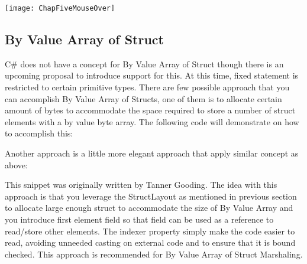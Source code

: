 \texttt{[image: ChapFiveMouseOver]}
\newpage

\subsection{By Value Array of Struct}
C\# does not have a concept for By Value Array of Struct though there is an upcoming proposal to introduce support for this. At this time, fixed statement is restricted to certain primitive types. There are few possible approach that you can accomplish By Value Array of Structs, one of them is to allocate certain amount of bytes to accommodate the space required to store a number of struct elements with a by value byte array. The following code will demonstrate on how to accomplish this:


\newpage
Another approach is a little more elegant approach that apply similar concept as above:



This snippet was originally written by Tanner Gooding.
\newline
\newline
The idea with this approach is that you leverage the StructLayout as mentioned in previous section to allocate large enough struct to accommodate the size of By Value Array and you introduce first element field so that field can be used as a reference to read/store other elements. The indexer property simply make the code easier to read, avoiding unneeded casting on external code and to ensure that it is bound checked. This approach is recommended for By Value Array of Struct Marshaling.
